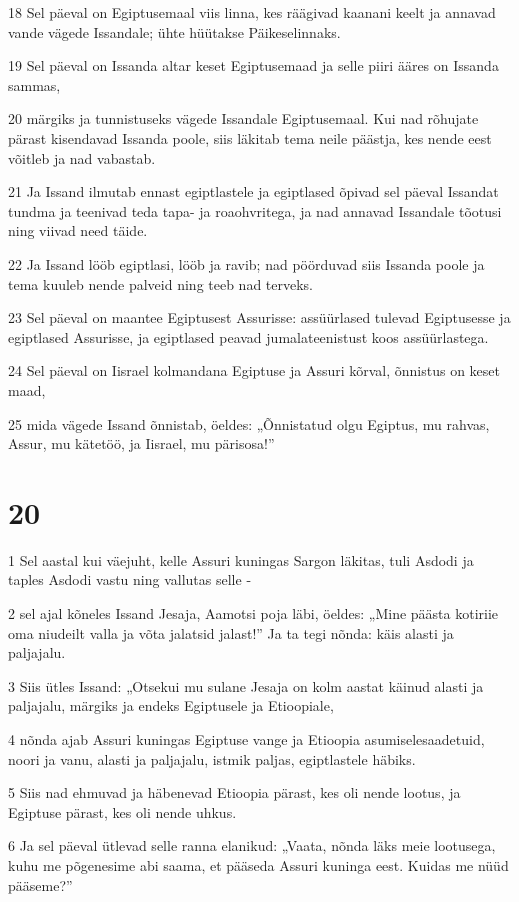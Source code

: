 \par 18 Sel päeval on Egiptusemaal viis linna, kes räägivad kaanani keelt ja annavad vande vägede Issandale; ühte hüütakse Päikeselinnaks.
\par 19 Sel päeval on Issanda altar keset Egiptusemaad ja selle piiri ääres on Issanda sammas,
\par 20 märgiks ja tunnistuseks vägede Issandale Egiptusemaal. Kui nad rõhujate pärast kisendavad Issanda poole, siis läkitab tema neile päästja, kes nende eest võitleb ja nad vabastab.
\par 21 Ja Issand ilmutab ennast egiptlastele ja egiptlased õpivad sel päeval Issandat tundma ja teenivad teda tapa- ja roaohvritega, ja nad annavad Issandale tõotusi ning viivad need täide.
\par 22 Ja Issand lööb egiptlasi, lööb ja ravib; nad pöörduvad siis Issanda poole ja tema kuuleb nende palveid ning teeb nad terveks.
\par 23 Sel päeval on maantee Egiptusest Assurisse: assüürlased tulevad Egiptusesse ja egiptlased Assurisse, ja egiptlased peavad jumalateenistust koos assüürlastega.
\par 24 Sel päeval on Iisrael kolmandana Egiptuse ja Assuri kõrval, õnnistus on keset maad,
\par 25 mida vägede Issand õnnistab, öeldes: „Õnnistatud olgu Egiptus, mu rahvas, Assur, mu kätetöö, ja Iisrael, mu pärisosa!”

\chapter{20}

\par 1 Sel aastal kui väejuht, kelle Assuri kuningas Sargon läkitas, tuli Asdodi ja taples Asdodi vastu ning vallutas selle -
\par 2 sel ajal kõneles Issand Jesaja, Aamotsi poja läbi, öeldes: „Mine päästa kotiriie oma niudeilt valla ja võta jalatsid jalast!” Ja ta tegi nõnda: käis alasti ja paljajalu.
\par 3 Siis ütles Issand: „Otsekui mu sulane Jesaja on kolm aastat käinud alasti ja paljajalu, märgiks ja endeks Egiptusele ja Etioopiale,
\par 4 nõnda ajab Assuri kuningas Egiptuse vange ja Etioopia asumiselesaadetuid, noori ja vanu, alasti ja paljajalu, istmik paljas, egiptlastele häbiks.
\par 5 Siis nad ehmuvad ja häbenevad Etioopia pärast, kes oli nende lootus, ja Egiptuse pärast, kes oli nende uhkus.
\par 6 Ja sel päeval ütlevad selle ranna elanikud: „Vaata, nõnda läks meie lootusega, kuhu me põgenesime abi saama, et pääseda Assuri kuninga eest. Kuidas me nüüd pääseme?”

